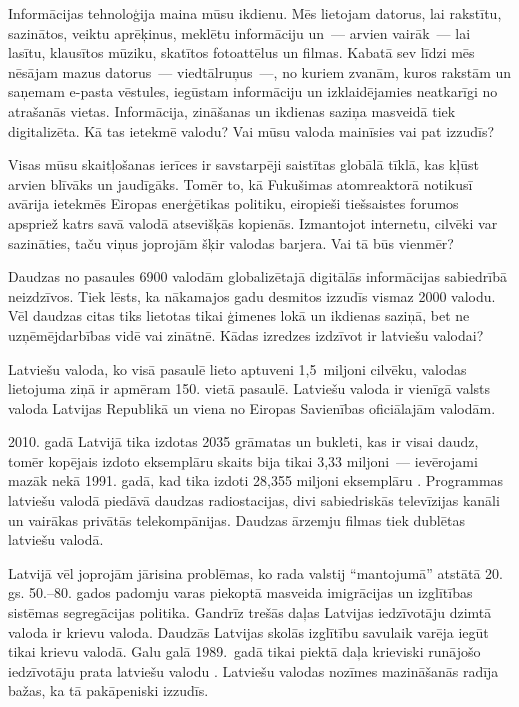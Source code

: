 \begin{multicols}{2}

Informācijas tehnoloģija maina mūsu ikdienu.
Mēs lietojam datorus, lai rakstītu, sazinātos, veiktu aprēķinus, meklētu informāciju un~--- arvien vairāk~--- lai lasītu, klausītos mūziku, skatītos fotoattēlus un filmas.
Kabatā sev līdzi mēs nēsājam mazus datorus~--- viedtālruņus~---, no kuriem zvanām, kuros rakstām un saņemam e-pasta vēstules, iegūstam informāciju un izklaidējamies neatkarīgi no atrašanās vietas.
Informācija, zināšanas un ikdienas saziņa masveidā tiek digitalizēta.
Kā tas ietekmē valodu?
Vai mūsu valoda mainīsies vai pat izzudīs? 

Visas mūsu skaitļošanas ierīces ir savstarpēji saistītas globālā tīklā, kas kļūst arvien blīvāks un jaudīgāks.
Tomēr to, kā Fukušimas atomreaktorā notikusī avārija ietekmēs Eiropas enerģētikas politiku, eiropieši tiešsaistes forumos apspriež katrs savā valodā atsevišķās kopienās.
Izmantojot internetu, cilvēki var sazināties, taču viņus joprojām šķir valodas barjera.
Vai tā būs vienmēr? 

Daudzas no pasaules 6900 valodām globalizētajā digitālās informācijas sabiedrībā neizdzīvos.
Tiek lēsts, ka nākamajos gadu desmitos izzudīs vismaz 2000 valodu.
Vēl daudzas citas tiks lietotas tikai ģimenes lokā un ikdienas saziņā, bet ne uzņēmējdarbības vidē vai zinātnē.
Kādas izredzes izdzīvot ir latviešu valodai?

Latviešu valoda, ko visā pasaulē lieto aptuveni 1,5~miljoni cilvēku, valodas lietojuma ziņā ir apmēram 150. vietā pasaulē.
Latviešu valoda ir vienīgā valsts valoda Latvijas Republikā un viena no Eiropas Savienības oficiālajām valodām. 

2010. gadā Latvijā tika izdotas 2035 grāmatas un bukleti, kas ir visai daudz, tomēr kopējais izdoto eksemplāru skaits bija tikai 3,33 miljoni~--- ievērojami mazāk nekā 1991. gadā, kad tika izdoti 28,355 miljoni eksemplāru \cite{Meta1ES}.
Programmas latviešu valodā piedāvā daudzas radiostacijas, divi sabiedriskās televīzijas kanāli un vairākas privātās telekompānijas.
Daudzas ārzemju filmas tiek dublētas latviešu valodā. 

Latvijā vēl joprojām jārisina problēmas, ko rada valstij ``mantojumā'' atstātā 20. gs. 50.–80. gados padomju varas piekoptā masveida imigrācijas un izglītības sistēmas segregācijas politika.
Gandrīz trešās daļas Latvijas iedzīvotāju dzimtā valoda ir krievu valoda.
Daudzās Latvijas skolās izglītību savulaik varēja iegūt tikai krievu valodā.
Galu galā 1989.~gadā tikai piektā daļa krieviski runājošo iedzīvotāju prata latviešu valodu \cite{Meta2ES}.
Latviešu valodas nozīmes mazināšanās radīja bažas, ka tā pakāpeniski izzudīs.


\end{multicols}
